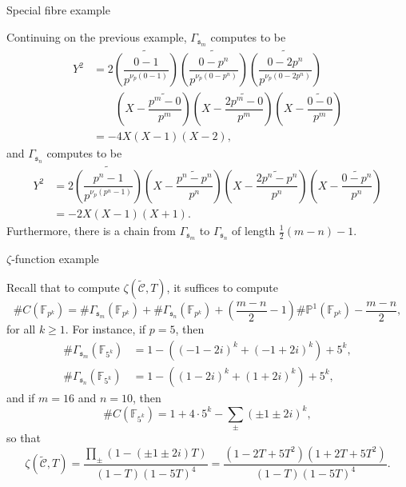 \documentclass[10pt]{beamer}
\begin{document}
\begin{frame}[t]{Special fibre example}

Continuing on the previous example, $ \Gamma_{\mathfrak{s}_m} $ computes to be
\begin{align*}
Y^2 & = 2\widetilde{\left(\dfrac{0 - 1}{p^{\nu_p(0 - 1)}}\right)}\widetilde{\left(\dfrac{0 - p^n}{p^{\nu_p(0 - p^n)}}\right)}\widetilde{\left(\dfrac{0 - 2p^n}{p^{\nu_p(0 - 2p^n)}}\right)} \\
& \qquad \left(X - \widetilde{\dfrac{p^m - 0}{p^m}}\right)\left(X - \widetilde{\dfrac{2p^m - 0}{p^m}}\right)\left(X - \widetilde{\dfrac{0 - 0}{p^m}}\right) \\
& = -4X(X - 1)(X - 2),
\end{align*}
and $ \Gamma_{\mathfrak{s}_n} $ computes to be
\begin{align*}
Y^2 & = 2\widetilde{\left(\dfrac{p^n - 1}{p^{\nu_p(p^n - 1)}}\right)}\left(X - \widetilde{\dfrac{p^n - p^n}{p^n}}\right)\left(X - \widetilde{\dfrac{2p^n - p^n}{p^n}}\right)\left(X - \widetilde{\dfrac{0 - p^n}{p^n}}\right) \\
& = -2X(X - 1)(X + 1).
\end{align*}
Furthermore, there is a chain from $ \Gamma_{\mathfrak{s}_m} $ to $ \Gamma_{\mathfrak{s}_n} $ of length $ \tfrac{1}{2}(m - n) - 1 $.

\end{frame}

\begin{frame}[t]{$ \zeta $-function example}

Recall that to compute $ \zeta(\widetilde{\mathcal{C}}, T) $, it suffices to compute
$$ \#C(\mathbb{F}_{p^k}) = \#\Gamma_{\mathfrak{s}_m}(\mathbb{F}_{p^k}) + \#\Gamma_{\mathfrak{s}_n}(\mathbb{F}_{p^k}) + \left(\dfrac{m - n}{2} - 1\right)\#\mathbb{P}^1(\mathbb{F}_{p^k}) - \dfrac{m - n}{2}, $$
for all $ k \ge 1 $. For instance, if $ p = 5 $, then
\begin{align*}
\#\Gamma_{\mathfrak{s}_m}(\mathbb{F}_{5^k}) & = 1 - ((-1 - 2i)^k + (-1 + 2i)^k) + 5^k, \\
\#\Gamma_{\mathfrak{s}_n}(\mathbb{F}_{5^k}) & = 1 - ((1 - 2i)^k + (1 + 2i)^k) + 5^k,
\end{align*}
and if $ m = 16 $ and $ n = 10 $, then
$$ \#C(\mathbb{F}_{5^k}) = 1 + 4 \cdot 5^k - \sum_\pm (\pm1 \pm 2i)^k, $$
so that
$$ \zeta(\widetilde{\mathcal{C}}, T) = \dfrac{\prod_\pm (1 - (\pm1 \pm 2i)T)}{(1 - T)(1 - 5T)^4} = \dfrac{(1 - 2T + 5T^2)(1 + 2T + 5T^2)}{(1 - T)(1 - 5T)^4}. $$

\end{frame}
\end{document}
